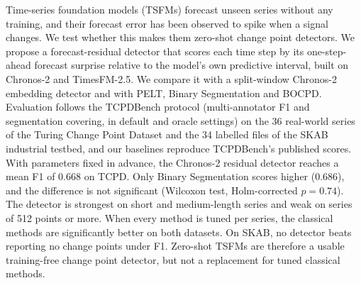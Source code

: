 Time-series foundation models (TSFMs) forecast unseen series without any training, and their forecast error has been observed to spike when a signal changes. We test whether this makes them zero-shot change point detectors. We propose a forecast-residual detector that scores each time step by its one-step-ahead forecast surprise relative to the model's own predictive interval, built on Chronos-2 and TimesFM-2.5. We compare it with a split-window Chronos-2 embedding detector and with PELT, Binary Segmentation and BOCPD. Evaluation follows the TCPDBench protocol (multi-annotator F1 and segmentation covering, in default and oracle settings) on the 36 real-world series of the Turing Change Point Dataset and the 34 labelled files of the SKAB industrial testbed, and our baselines reproduce TCPDBench's published scores. With parameters fixed in advance, the Chronos-2 residual detector reaches a mean F1 of 0.668 on TCPD. Only Binary Segmentation scores higher (0.686), and the difference is not significant (Wilcoxon test, Holm-corrected $p=0.74$). The detector is strongest on short and medium-length series and weak on series of 512 points or more. When every method is tuned per series, the classical methods are significantly better on both datasets. On SKAB, no detector beats reporting no change points under F1. Zero-shot TSFMs are therefore a usable training-free change point detector, but not a replacement for tuned classical methods.
